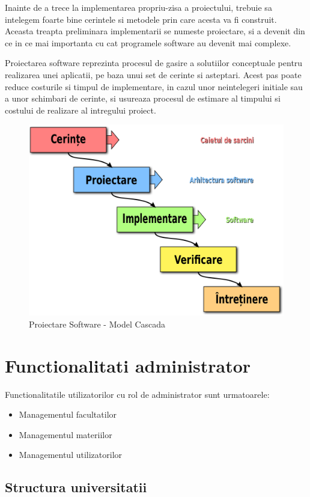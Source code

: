 \documentclass[12pt, a4paper, oneside, romanian]{teza-upb}
\begin{document}
Inainte de a trece la implementarea propriu-zisa a proiectului, trebuie sa intelegem foarte bine cerintele si metodele prin care acesta va fi construit. Aceasta treapta preliminara implementarii se numeste proiectare, si a devenit din ce in ce mai importanta cu cat programele software au devenit mai complexe.

Proiectarea software reprezinta procesul de gasire a solutiilor conceptuale pentru realizarea unei aplicatii, pe baza unui set de cerinte si asteptari. Acest pas poate reduce costurile si timpul de implementare, in cazul unor neintelegeri initiale sau a unor schimbari de cerinte, si usureaza procesul de estimare al timpului si costului de realizare al intregului proiect.

\begin{figure}[H]
\centering
\includegraphics*[width=0.55\columnwidth]{proiectare-software-model-cascada}
\caption{Proiectare Software - Model Cascada\cite{proiectaresoftwaremodelcascada}}
\label{proiectare-software-model-cascada}
\end{figure}

\section{Functionalitati administrator}

Functionalitatile utilizatorilor cu rol de administrator sunt urmatoarele:
\begin{itemize}
	\item Managementul facultatilor
	\item Managementul materiilor
	\item Managementul utilizatorilor
\end{itemize}

\subsection{Structura universitatii}
\end{document}
